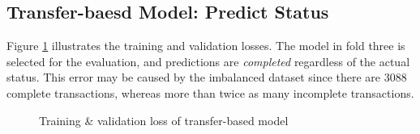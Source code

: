 \documentclass[12pt,twoside]{report}
\begin{document}
\subsection{Transfer-baesd Model: Predict Status}
Figure \ref{transfer_based_status} illustrates the training and validation losses. The model in fold three is selected for the evaluation, and predictions are \textit{completed} regardless of the actual status. This error may be caused by the imbalanced dataset since there are 3088 complete transactions, whereas more than twice as many incomplete transactions. 

\begin{figure}[!htbp]
	\centering
	\hfill
	\hfill
	\hfil
	\hfil
	\caption{Training \& validation loss of transfer-based model}
	\label{transfer_based_status}
\end{figure}
\end{document}
